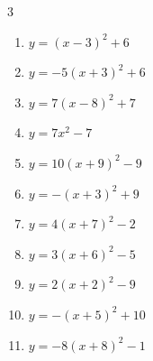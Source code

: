 \begin{multicols}{3}
\begin{enumerate}
        \phantom{$\displaystyle 頂点\left( -2 , 1 \right)$}

  \item $\displaystyle y=\left( x-3\right)^{2}+6$

        \phantom{$\displaystyle 頂点\left( 3 , 6 \right)$}

  \item $\displaystyle y=-5\left( x+3\right)^{2}+6$

        \phantom{$\displaystyle 頂点\left( -3 , 6 \right)$}

  \item $\displaystyle y=7\left( x-8\right)^{2}+7$

        \phantom{$\displaystyle 頂点\left( 8 , 7 \right)$}

  \item $\displaystyle y=7x^{2}-7$

        \phantom{$\displaystyle 頂点\left( 0 , -7 \right)$}

  \item $\displaystyle y=10\left( x+9\right)^{2}-9$

        \phantom{$\displaystyle 頂点\left( -9 , -9 \right)$}

  \item $\displaystyle y=-\left( x+3\right)^{2}+9$

        \phantom{$\displaystyle 頂点\left( -3 , 9 \right)$}

  \item $\displaystyle y=4\left( x+7\right)^{2}-2$

        \phantom{$\displaystyle 頂点\left( -7 , -2 \right)$}

  \item $\displaystyle y=3\left( x+6\right)^{2}-5$

        \phantom{$\displaystyle 頂点\left( -6 , -5 \right)$}

  \item $\displaystyle y=2\left( x+2\right)^{2}-9$

        \phantom{$\displaystyle 頂点\left( -2 , -9 \right)$}

  \item $\displaystyle y=-\left( x+5\right)^{2}+10$

        \phantom{$\displaystyle 頂点\left( -5 , 10 \right)$}

  \item $\displaystyle y=-8\left( x+8\right)^{2}-1$

        \phantom{$\displaystyle 頂点\left( -8 , -1 \right)$}


\end{enumerate}
\end{multicols}
